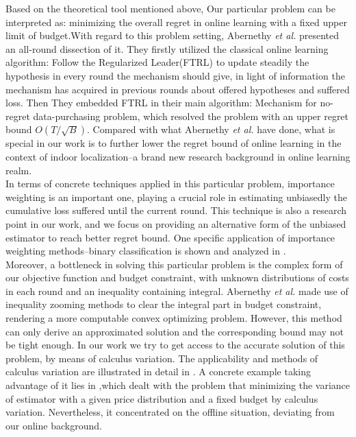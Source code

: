 \documentclass[10pt,conference,compsocconf,letterpaper]{IEEEtran}
\begin{document}
Based on the theoretical tool mentioned above, Our particular problem can be interpreted as: minimizing the overall regret in online learning with a fixed upper limit of budget.With regard to this problem setting, Abernethy \emph{et al.} presented an all-round dissection of it\cite{abernethy2015low}. They firstly utilized the classical online learning algorithm: Follow the Regularized Leader(FTRL) to update steadily the hypothesis in every round the mechanism should give, in light of information the mechanism has acquired in previous rounds about offered hypotheses and suffered loss. Then They embedded FTRL in their main algorithm: Mechanism for no-regret data-purchasing problem, which resolved the problem with an upper regret bound $O(T/\sqrt{B})$. Compared with what Abernethy \emph{et al.} have done\cite{abernethy2015low}, what is special in our work is to further lower the regret bound of online learning in the context of indoor localization--a brand new research background in online learning realm.\\
\indent In terms of concrete techniques applied in this particular problem, importance weighting is an important one, playing a crucial role in estimating unbiasedly the cumulative loss suffered until the current round\cite{abernethy2015low}. This technique is also a research point in our work, and we focus on providing an alternative form of the unbiased estimator to reach better regret bound. One specific application of importance weighting methods--binary classification is shown and analyzed in \cite{beygelzimer2009importance}.\\
\indent Moreover, a bottleneck in solving this particular problem is the complex form of our objective function and budget constraint, with unknown distributions of costs in each round and an inequality containing integral. Abernethy \emph{et al.} made use of inequality zooming methods to clear the integral part in budget constraint, rendering a more computable convex optimizing problem\cite{abernethy2015low}. However, this method can only derive an approximated solution and the corresponding bound may not be tight enough. In our work we try to get access to the accurate solution of this problem, by means of calculus variation. The applicability and methods of calculus variation are illustrated in detail in \cite{liberzon2012calculus}  . A concrete example taking advantage of it lies in \cite{roth2012conducting},which dealt with the problem that minimizing the variance of estimator with a given price distribution and a fixed budget by calculus variation. Nevertheless, it concentrated on the offline situation, deviating from our online background.
\end{document}
